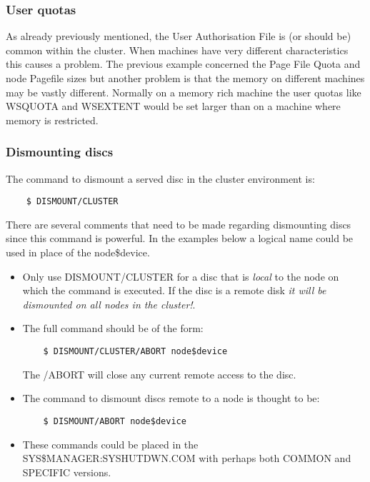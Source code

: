 \subsubsection {User quotas}
As already previously mentioned, the User Authorisation File is (or should
be) common within the cluster.
When machines have very different characteristics this causes a problem.
The previous example concerned the Page File Quota and node Pagefile sizes
but another problem is that the memory on different machines may be vastly
different.
Normally on a memory rich machine the user quotas like WSQUOTA and WSEXTENT
would be set larger than on a machine where memory is restricted.

\subsubsection {Dismounting discs}

The command to dismount a served disc in the cluster environment is:
\begin{verbatim}
    $ DISMOUNT/CLUSTER
\end{verbatim}
There are several comments that need to be made regarding dismounting discs
since this command is powerful.
In the examples below a logical name could be used in place of the node\$device.

\begin {itemize}
\item Only use DISMOUNT/CLUSTER for a disc that is {\em local} to the node
on which the command is executed.
If the disc is a remote disk {\em it will be dismounted on all nodes in the
cluster!}.

\item The full command should be of the form:
\begin{verbatim}
    $ DISMOUNT/CLUSTER/ABORT node$device
\end{verbatim}
The /ABORT will close any current remote access to the disc.

\item The command to dismount discs remote to a node is thought to be:
\begin{verbatim}
    $ DISMOUNT/ABORT node$device
\end{verbatim}
\item These commands could be placed in the SYS\$MANAGER:SYSHUTDWN.COM
with perhaps both COMMON and SPECIFIC versions.
\end {itemize}

